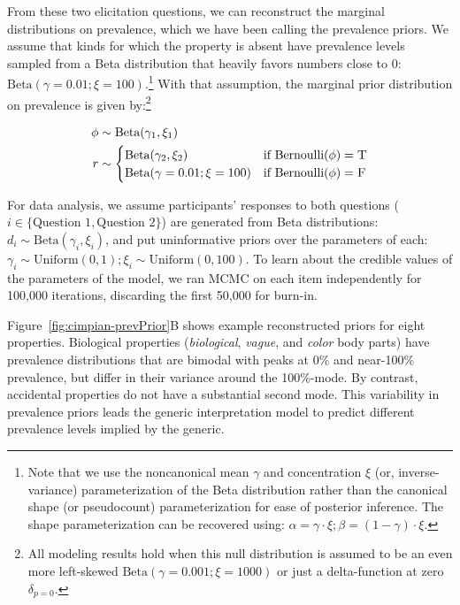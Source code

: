 \documentclass[floatsintext,doc]{apa6}
\let\rmarkdownfootnote\footnote%
\def\footnote{\protect\rmarkdownfootnote}
\begin{document}
From these two elicitation questions, we can reconstruct the marginal distributions on prevalence, which we have been calling the prevalence priors.
We assume that kinds for which the
property is absent have prevalence levels sampled from a Beta
distribution that heavily favors numbers close to 0:
\(\text{Beta}(\gamma = 0.01; \xi = 100)\).\footnote{Note that we use the
  noncanonical mean \(\gamma\) and concentration \(\xi\) (or,
  inverse-variance) parameterization of the Beta distribution rather
  than the canonical shape (or pseudocount) parameterization for ease of
  posterior inference. The shape parameterization can be recovered
  using: \(\alpha = \gamma \cdot \xi; \beta = (1 - \gamma) \cdot \xi\).}
With that assumption, the marginal prior distribution on prevalence is given by:\footnote{All
  modeling results hold when this null distribution is assumed to be an
  even more left-skewed \(\text{Beta}(\gamma = 0.001; \xi = 1000)\) or
  just a delta-function at zero \(\delta_{p=0}\).}

\begin{align}
\phi & \sim \text{Beta}(\gamma_1, \xi_1) \nonumber \\ 
r & \sim \begin{cases}
        \text{Beta}(\gamma_2, \xi_2) &\mbox{if } \text{Bernoulli}(\phi) = \textsc{T} \label{eq:priorModel}  \\
        \text{Beta}(\gamma = 0.01; \xi = 100) &\mbox{if } \text{Bernoulli}(\phi) = \textsc{F} \\
        \end{cases}
\end{align}

For data analysis, we assume participants' responses to both questions
(\(i \in \{\text{Question 1}, \text{Question 2}\}\)) are generated from
Beta distributions: \(d_{i} \sim \text{Beta}(\gamma_i, \xi_i)\), and put
uninformative priors over the parameters of each:
\(\gamma_i \sim \text{Uniform}(0, 1); \xi_i \sim \text{Uniform}(0, 100)\).
To learn
about the credible values of the parameters of the model, we ran MCMC on
each item independently for 100,000 iterations, discarding the first
50,000 for burn-in.

Figure~\ref{fig:cimpian-prevPrior}B shows example reconstructed priors for eight properties.
Biological properties (\emph{biological}, \emph{vague}, and \emph{color}
body parts) have prevalence distributions that are bimodal with peaks at
0\% and near-100\% prevalence, but differ in their variance around the
100\%-mode. By contrast, accidental properties do not have a substantial
second mode. This variability in prevalence priors leads the generic
interpretation model to predict different prevalence levels implied by
the generic.
\end{document}
